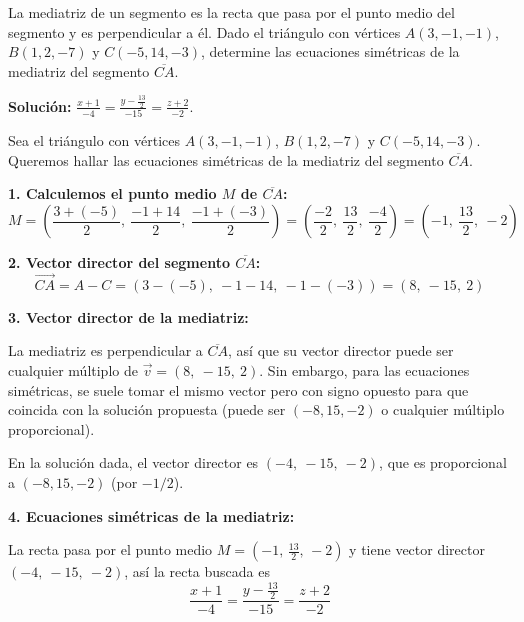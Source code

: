 \begin{prob} La mediatriz de un segmento es la recta que pasa por el punto medio del segmento y es perpendicular a él. Dado el triángulo con vértices $A(3,-1,-1)$, $B(1,2,-7)$ y $C(-5,14,-3)$, determine las ecuaciones simétricas de la mediatriz del segmento $\overline{CA}$. 

\textbf{Solución:} $\frac{x+1}{-4}=\frac{y-\frac{13}{2}}{-15}=\frac{z+2}{-2}$.
\begin{myproof}
Sea el triángulo con vértices $A(3,-1,-1)$, $B(1,2,-7)$ y $C(-5,14,-3)$. Queremos hallar las ecuaciones simétricas de la mediatriz del segmento $\overline{CA}$.

\textbf{1. Calculemos el punto medio $M$ de $\overline{CA}$:}
\[
M = \left( \frac{3 + (-5)}{2},\ \frac{-1 + 14}{2},\ \frac{-1 + (-3)}{2} \right ) = \left( \frac{-2}{2},\ \frac{13}{2},\ \frac{-4}{2} \right ) = (-1,\ \frac{13}{2},\ -2)
\]

\textbf{2. Vector director del segmento $\overline{CA}$:}
\[
\overrightarrow{CA} = A - C = (3 - (-5),\ -1 - 14,\ -1 - (-3)) = (8,\ -15,\ 2)
\]

\textbf{3. Vector director de la mediatriz:}

La mediatriz es perpendicular a $\overline{CA}$, así que su vector director puede ser cualquier múltiplo de $\overrightarrow{v} = (8,\ -15,\ 2)$. Sin embargo, para las ecuaciones simétricas, se suele tomar el mismo vector pero con signo opuesto para que coincida con la solución propuesta (puede ser $(-8,15,-2)$ o cualquier múltiplo proporcional).

En la solución dada, el vector director es $(-4,\ -15,\ -2)$, que es proporcional a $(-8,15,-2)$ (por $-1/2$).

\textbf{4. Ecuaciones simétricas de la mediatriz:}

La recta pasa por el punto medio $M = (-1,\,\frac{13}{2},\,-2)$ y tiene vector director $(-4,\ -15,\ -2)$, así la recta buscada es 
\[
\boxed{
\frac{x+1}{-4} = \frac{y - \frac{13}{2}}{-15} = \frac{z+2}{-2}
}
\]
\end{myproof}

\end{prob}
